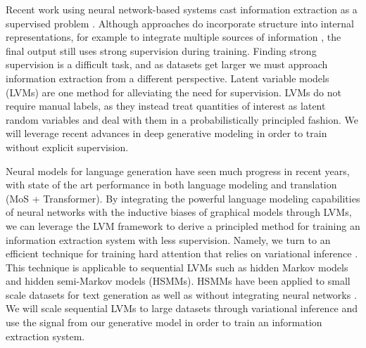 \documentclass[11pt]{article}
\begin{document}
Recent work using neural network-based systems cast information extraction
as a supervised problem
\citep{wiseman2017d2t,dossantos2015classification}.
Although approaches do incorporate structure into internal representations,
for example to integrate multiple sources of information \citep{weissenborn17},
the final output still uses strong supervision during training.
Finding strong supervision is a difficult task, and as datasets get larger
we must approach information extraction from a different perspective.
Latent variable models (LVMs) are one method for alleviating the need for supervision.
LVMs do not require manual labels, as they instead treat quantities of interest
as latent random variables and deal with them in a probabilistically principled 
fashion.
We will leverage recent advances in deep generative modeling in order to
train without explicit supervision.

Neural models for language generation have seen much progress in recent years,
with state of the art performance in both language modeling and translation \citep{?} (MoS + Transformer).
By integrating the powerful language modeling capabilities of neural networks with
the inductive biases of graphical models through LVMs,
we can leverage the LVM framework to derive a principled method
for training an information extraction system with less supervision.
Namely, we turn to an efficient technique for training hard attention 
that relies on variational inference \citep{deng2018attn}.
This technique is applicable to sequential LVMs such as hidden Markov models 
and hidden semi-Markov models (HSMMs).
HSMMs have been applied to small scale datasets for text generation \citep{wiseman2018template}
as well as without integrating neural networks \citep{liang2009semalign}.
We will scale sequential LVMs to large datasets through variational inference and use
the signal from our generative model in order to train an information extraction system.

\end{document}

